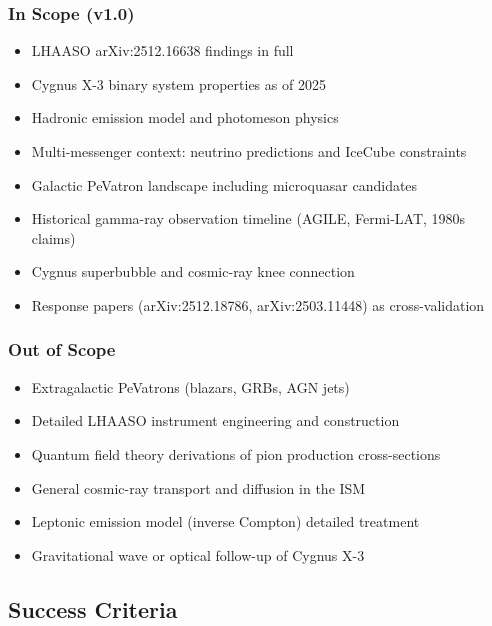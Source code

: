 \documentclass[11pt,letterpaper]{article}
\begin{document}
\subsubsection{In Scope (v1.0)}
\begin{itemize}[noitemsep]
  \item LHAASO arXiv:2512.16638 findings in full
  \item Cygnus X-3 binary system properties as of 2025
  \item Hadronic emission model and photomeson physics
  \item Multi-messenger context: neutrino predictions and IceCube constraints
  \item Galactic PeVatron landscape including microquasar candidates
  \item Historical gamma-ray observation timeline (AGILE, Fermi-LAT, 1980s claims)
  \item Cygnus superbubble and cosmic-ray knee connection
  \item Response papers (arXiv:2512.18786, arXiv:2503.11448) as cross-validation
\end{itemize}

\subsubsection{Out of Scope}
\begin{itemize}[noitemsep]
  \item Extragalactic PeVatrons (blazars, GRBs, AGN jets)
  \item Detailed LHAASO instrument engineering and construction
  \item Quantum field theory derivations of pion production cross-sections
  \item General cosmic-ray transport and diffusion in the ISM
  \item Leptonic emission model (inverse Compton) detailed treatment
  \item Gravitational wave or optical follow-up of Cygnus X-3
\end{itemize}

\subsection{Success Criteria}
\end{document}
